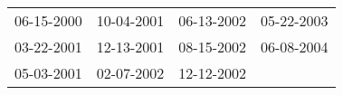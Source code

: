 \begin{supertabular}{llll}
 06-15-2000 &  10-04-2001 &  06-13-2002 &  05-22-2003 \\
 03-22-2001 &  12-13-2001 &  08-15-2002 &  06-08-2004 \\
 05-03-2001 &  02-07-2002 &  12-12-2002 &             \\
\end{supertabular}
